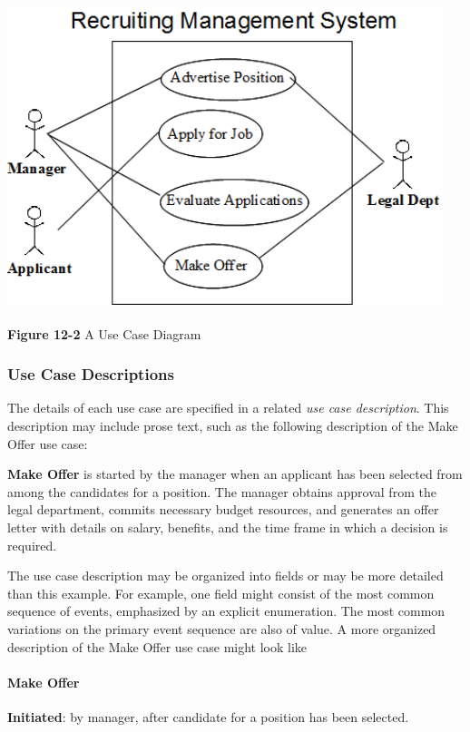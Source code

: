 \includegraphics[width=5.0in,height=3.5in]{ub-img/usecase2.png}

{\sffamily\bfseries Figure 12-2}
{\sffamily A Use Case Diagram}

\bigskip

\subsubsection{Use Case Descriptions}
The details of each use case are specified in a related \textit{use case
description}. This description may include prose text, such as the
following description of the {\textquotedbl}Make Offer{\textquotedbl}
use case:

\textbf{Make Offer} is started by the manager when an applicant has been
selected from among the candidates for a position. The manager obtains
approval from the legal department, commits necessary budget resources,
and generates an offer letter with details on salary, benefits, and the
time frame in which a decision is required.

The use case description may be organized into fields or may be more
detailed than this example. For example, one field might consist of the
most common sequence of events, emphasized by an explicit enumeration.
The most common variations on the primary event sequence are also of
value. A more organized description of the Make Offer use case might
look like

\paragraph[Make Offer]{\bfseries Make Offer}
\textbf{Initiated}: by manager, after candidate for a position has been
selected.

